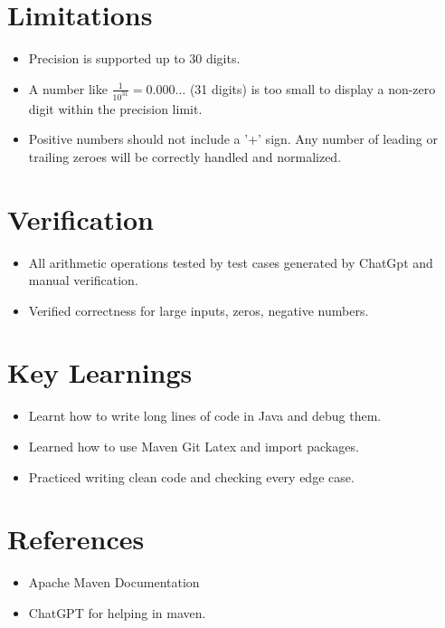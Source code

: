 \documentclass[12pt]{article}
\begin{document}
\section{Limitations}
\begin{itemize}[leftmargin=*]
    \item Precision is supported up to 30 digits.
    \item A number like \( \frac{1}{10^{31}} = 0.000\ldots \) (31 digits) is too small to display a non-zero digit within the precision limit.
    \item Positive numbers should not include a '+' sign. Any number of leading or trailing zeroes will be correctly handled and normalized.
\end{itemize}
\section{Verification}
\begin{itemize}[leftmargin=*]
    \item All arithmetic operations tested by test cases generated by ChatGpt and manual verification.
    \item Verified correctness for large inputs, zeros, negative numbers.
\end{itemize}
\section{Key Learnings}
\begin{itemize}[leftmargin=*]
    \item Learnt how to write long lines of code in Java and debug them.
    \item Learned how to use Maven Git Latex and import packages.
    \item Practiced writing clean code and checking every edge case.
\end{itemize}

\section{References}
\begin{itemize}[leftmargin=*]
    \item Apache Maven Documentation
    \item ChatGPT for helping in maven.
\end{itemize}
\end{document}
